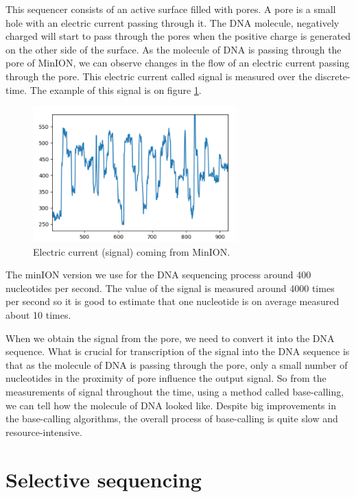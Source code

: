 This sequencer consists of an active surface filled with pores. A pore is a small
hole with an electric current passing through it. The DNA molecule, negatively charged
will start to pass through the pores when the positive charge is generated on the
other side of the surface. As the molecule of DNA is passing through the pore of
MinION, we can observe changes in the flow of an electric current passing through the pore.
This electric current called signal is measured over the discrete-time. The example
of this signal is on figure \ref{obr:minIonCurrent}.

\begin{figure}
\centerline{\includegraphics[width=0.7\textwidth, height=0.3\textheight]{images/signal}}
\caption[MinION signal]{Electric current (signal) coming from MinION.}
\label{obr:minIonCurrent}
\end{figure}

The minION version we use for the DNA sequencing process around 400 nucleotides per second.
The value of the signal is measured around 4000 times per second so it is good to
estimate that one nucleotide is on average measured about 10 times.

When we obtain the signal from the pore, we need to convert it into the DNA
sequence. What is crucial for transcription of the signal into the DNA sequence is
that as the molecule of DNA is passing through the pore, only a small
number of nucleotides in the proximity of pore influence the output signal. So from
the measurements of signal throughout the time, using a method called base-calling,
we can tell how the molecule of DNA looked like. Despite big improvements in the
base-calling algorithms, the overall process of base-calling is quite slow and
resource-intensive.

\section{Selective sequencing}

